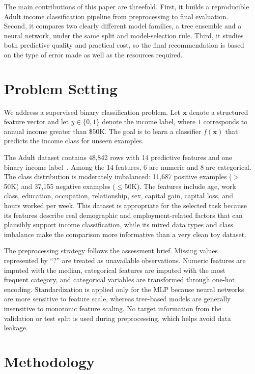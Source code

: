 \documentclass[10pt,twocolumn,letterpaper]{article}
\begin{document}
The main contributions of this paper are threefold. First, it builds a reproducible Adult income classification pipeline from preprocessing to final evaluation. Second, it compares two clearly different model families, a tree ensemble and a neural network, under the same split and model-selection rule. Third, it studies both predictive quality and practical cost, so the final recommendation is based on the type of error made as well as the resources required.

\section{Problem Setting}
We address a supervised binary classification problem. Let $\mathbf{x}$ denote a structured feature vector and let $y \in \{0,1\}$ denote the income label, where $1$ corresponds to annual income greater than \$50K. The goal is to learn a classifier $f(\mathbf{x})$ that predicts the income class for unseen examples.

The Adult dataset contains 48,842 rows with 14 predictive features and one binary income label~\cite{uciadult}. Among the 14 features, 6 are numeric and 8 are categorical. The class distribution is moderately imbalanced: 11,687 positive examples ($>$50K) and 37,155 negative examples ($\leq$50K). The features include age, work class, education, occupation, relationship, sex, capital gain, capital loss, and hours worked per week. This dataset is appropriate for the selected task because its features describe real demographic and employment-related factors that can plausibly support income classification, while its mixed data types and class imbalance make the comparison more informative than a very clean toy dataset.

The preprocessing strategy follows the assessment brief. Missing values represented by ``?'' are treated as unavailable observations. Numeric features are imputed with the median, categorical features are imputed with the most frequent category, and categorical variables are transformed through one-hot encoding. Standardization is applied only for the MLP because neural networks are more sensitive to feature scale, whereas tree-based models are generally insensitive to monotonic feature scaling. No target information from the validation or test split is used during preprocessing, which helps avoid data leakage.

\section{Methodology}
\end{document}
